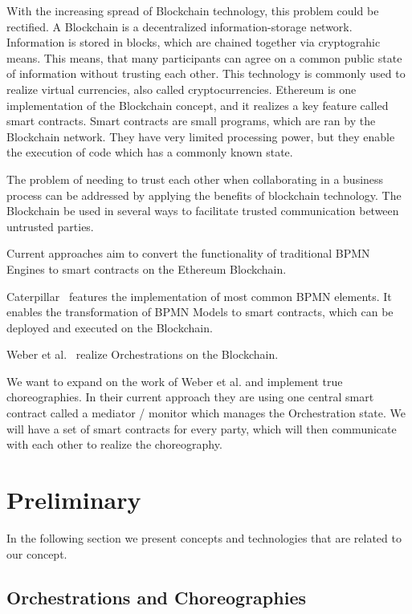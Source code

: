 \documentclass[runningheads]{llncs}
\begin{document}
With the increasing spread of Blockchain technology, this problem could be rectified.
A Blockchain is a decentralized information-storage network. Information is stored in blocks, which are chained together via cryptograhic means. This means, that many participants can agree on a common public state of information without trusting each other. This technology is commonly used to realize virtual currencies, also called cryptocurrencies.
Ethereum is one implementation of the Blockchain concept, and it realizes a key feature called smart contracts.
Smart contracts are small programs, which are ran by the Blockchain network. They have very limited processing power, but they enable the execution of code which has a commonly known state.

The problem of needing to trust each other when collaborating in a business process can be addressed by applying the benefits of blockchain technology. The Blockchain be used in several ways to facilitate trusted communication between untrusted parties.

Current approaches aim to convert the functionality of traditional BPMN Engines to smart contracts on the Ethereum Blockchain.

Caterpillar~\cite{lopez2017caterpillar} features the implementation of most common BPMN elements. It enables the transformation of BPMN Models to smart contracts, which can be deployed and executed on the Blockchain.

Weber et al.~\cite{weber2016untrusted} realize Orchestrations on the Blockchain.

We want to expand on the work of Weber et al. and implement true choreographies. In their current approach they are using one central smart contract called a mediator / monitor which manages the Orchestration state.
We will have a set of smart contracts for every party, which will then communicate with each other to realize the choreography.

\section{Preliminary}
In the following section we present concepts and technologies that are related to our concept.

\subsection{Orchestrations and Choreographies}
\end{document}
